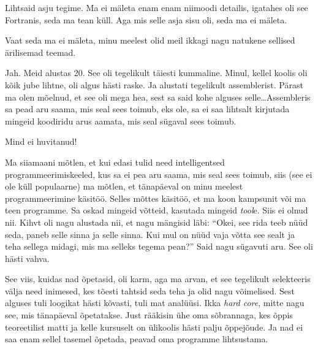 Lihtsaid asju tegime. Ma ei mäleta enam enam niimoodi detailis, igatahes oli see Fortranis, seda ma tean küll. Aga mis selle asja sisu oli, seda ma ei mäleta. 


Vaat seda ma ei mäleta, minu meelest olid meil ikkagi nagu natukene sellised ärilisemad teemad. 


Jah. Meid alustas 20. See oli tegelikult täiesti kummaline. Minul, kellel koolis oli kõik jube lihtne, oli algus hästi raske. Ja alustati tegelikult assemblerist. Pärast ma olen mõelnud, et see oli mega hea, sest sa said kohe alguses selle\ldots Assembleris  sa pead aru saama, mis seal sees toimub, eks ole, sa ei saa lihtsalt kirjutada mingeid koodiridu arus aamata, mis seal sügaval sees toimub. 


Mind ei huvitanud!


Ma siiamaani mõtlen, et kui edasi tulid need intelligentsed programmeerimiskeeled, kus sa ei pea  aru saama, mis seal sees toimub, siis (see ei ole küll populaarne) ma mõtlen, et tänapäeval on minu meelest programmeerimine käsitöö. Selles mõttes käsitöö, et ma koon kampsunit või ma teen programme. Sa oskad mingeid võtteid,  kasutada mingeid \emph{tool}e. Siis ei olnud nii. Kihvt oli nagu alustada nii, et nagu mängisid läbi: \enquote{Okei, see rida teeb nüüd seda, paneb selle sinna ja selle sinna. Kui mul on nüüd vaja võtta see sealt ja teha sellega midagi, mis ma selleks tegema pean?} Said nagu sügavuti aru. See oli hästi vahva. 

See viis, kuidas nad õpetasid, oli karm, aga ma arvan, et see tegelikult selekteeris välja need inimesed, kes tõesti tahtsid seda teha ja olid nagu võimelised. Sest  alguses tuli loogikat hästi kõvasti, tuli mat analüüsi. Ikka \emph{hard core}, mitte nagu see, mis tänapäeval õpetatakse. Just rääkisin ühe oma sõbrannaga, kes õppis teoreetilist matti ja kelle kursuselt on ülikoolis hästi palju õppejõude. Ja nad ei saa enam sellel tasemel õpetada, peavad oma programme lihtsustama. 

